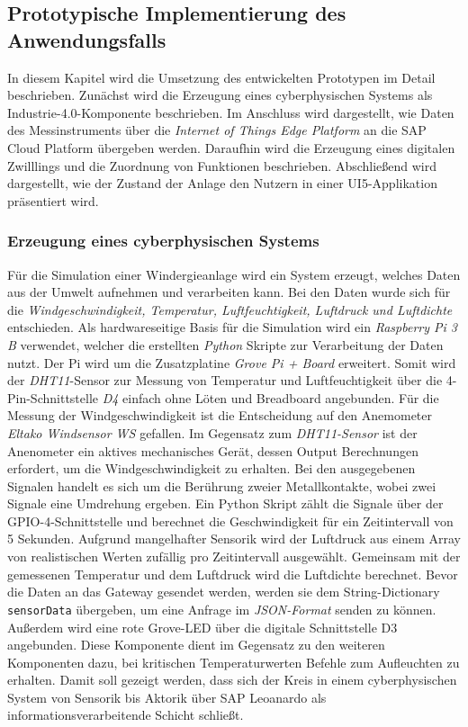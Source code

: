 

\subsection{Prototypische Implementierung des Anwendungsfalls}

In diesem Kapitel wird die Umsetzung des entwickelten Prototypen im Detail beschrieben.
Zunächst wird die Erzeugung eines cyberphysischen Systems als Industrie-4.0-Komponente beschrieben. Im Anschluss wird dargestellt, wie Daten des Messinstruments über die \textit{Internet of Things Edge Platform} an die SAP Cloud Platform übergeben werden. Daraufhin wird die Erzeugung eines digitalen Zwilllings und die Zuordnung von Funktionen beschrieben. Abschließend wird dargestellt, wie der Zustand der Anlage den Nutzern in einer UI5-Applikation präsentiert wird.

\subsubsection{Erzeugung eines cyberphysischen Systems}

Für die Simulation einer Windergieanlage wird ein System erzeugt, welches Daten aus der Umwelt aufnehmen und verarbeiten kann. Bei den Daten wurde sich für die \textit{Windgeschwindigkeit, Temperatur, Luftfeuchtigkeit, Luftdruck und Luftdichte} entschieden.
Als hardwareseitige Basis für die Simulation wird ein \textit{Raspberry Pi 3 B} verwendet, welcher die erstellten \textit{Python} Skripte zur Verarbeitung der Daten nutzt. Der Pi wird um die Zusatzplatine \textit{Grove Pi + Board} erweitert. Somit wird der \textit{DHT11}-Sensor zur Messung von Temperatur und Luftfeuchtigkeit über die 4-Pin-Schnittstelle \textit{D4} einfach ohne Löten und Breadboard angebunden. Für die Messung der Windgeschwindigkeit ist die Entscheidung auf den Anemometer \textit{Eltako Windsensor WS} gefallen. Im Gegensatz zum \textit{DHT11-Sensor} ist der Anenometer ein aktives mechanisches Gerät, dessen Output Berechnungen erfordert, um die Windgeschwindigkeit zu erhalten. Bei den ausgegebenen Signalen handelt es sich um die Berührung zweier Metallkontakte, wobei zwei Signale eine Umdrehung ergeben. Ein Python Skript zählt die Signale über der GPIO-4-Schnittstelle und berechnet die Geschwindigkeit für ein Zeitintervall von 5 Sekunden. Aufgrund mangelhafter Sensorik wird der Luftdruck aus einem Array von realistischen Werten zufällig pro Zeitintervall ausgewählt. Gemeinsam mit der gemessenen Temperatur und dem Luftdruck wird die Luftdichte berechnet. Bevor die Daten an das Gateway gesendet werden, werden sie dem String-Dictionary \texttt{sensorData} übergeben, um eine Anfrage im \textit{JSON-Format} senden zu können.
 Außerdem wird eine rote Grove-LED über die digitale Schnittstelle D3 angebunden. Diese Komponente dient im Gegensatz zu den weiteren Komponenten dazu, bei kritischen Temperaturwerten Befehle zum Aufleuchten zu erhalten. Damit soll gezeigt werden, dass sich der Kreis in einem cyberphysischen System von Sensorik bis Aktorik über SAP Leoanardo als informationsverarbeitende Schicht schließt.

